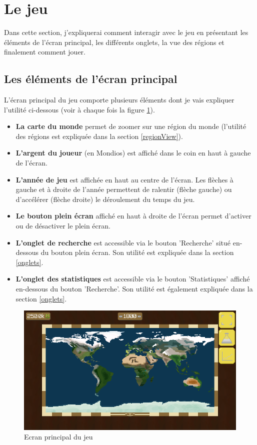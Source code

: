 \documentclass{article}
\begin{document}
        \section{Le jeu}
		Dans cette section, j'expliquerai comment interagir avec le jeu en présentant les éléments de l'écran principal, les différents onglets, la vue des régions et finalement comment jouer.        
        
        \subsection{Les éléments de l'écran principal}\label{mainScreenEls}
		L'écran principal du jeu comporte plusieurs éléments dont je vais expliquer l'utilité ci-dessous (voir à chaque fois la figure \ref{fig:worldView}).
		
		\begin{itemize}
			\item \textbf{La carte du monde} permet de zoomer sur une région du monde (l'utilité des régions est expliquée dans la section \ref{regionView}).
			\item \textbf{L'argent du joueur} (en Mondios) est affiché dans le coin en haut à gauche de l'écran.
			\item \textbf{L'année de jeu} est affichée en haut au centre de l'écran. Les flèches à gauche et à droite de l'année permettent de ralentir (flèche gauche) ou d’accélérer (flèche droite) le déroulement du temps du jeu.
			\item \textbf{Le bouton plein écran} affiché en haut à droite de l'écran permet d'activer ou de désactiver le plein écran.
			\item \textbf{L'onglet de recherche} est accessible via le bouton 'Recherche' situé en-dessous du bouton plein écran. Son utilité est expliquée dans la section \ref{onglets}.
			\item  \textbf{L'onglet des statistiques} est accessible via le bouton 'Statistiques' affiché en-dessous du bouton 'Recherche'. Son utilité est également expliquée dans la section \ref{onglets}.
		\end{itemize}
		
		\begin{figure}[H]
                \includegraphics[width=\linewidth]{../images/worldView}
                \caption{Ecran principal du jeu}
                \label{fig:worldView}
        \end{figure} 
		
\end{document}
